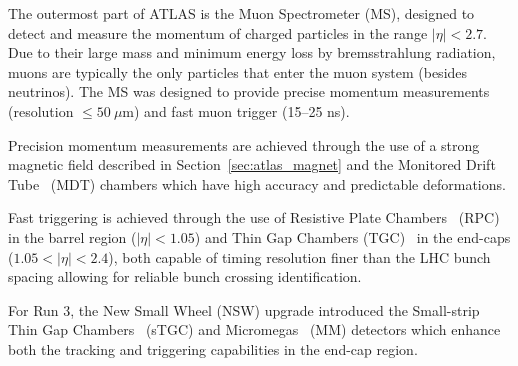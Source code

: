 The outermost part of ATLAS is the Muon Spectrometer (MS), designed to detect and measure the momentum of charged particles in the range $|\eta| < 2.7$. Due to their large mass and minimum energy loss by bremsstrahlung radiation, muons are typically the only particles that enter the muon system (besides neutrinos)\@. The MS was designed to provide precise momentum measurements (resolution $\leq 50 ~\mu$m) and fast muon trigger (15--25 ns). 

Precision momentum measurements are achieved through the use of a strong magnetic field described in Section~\ref{sec:atlas_magnet} and the Monitored Drift Tube~\cite{atlas_mdt_paper} (MDT) chambers which have high accuracy and predictable deformations.

Fast triggering is achieved through the use of Resistive Plate Chambers~\cite{atlas_run3_rpc_paper} (RPC) in the barrel region ($|\eta| < 1.05$) and Thin Gap Chambers (TGC)~\cite{atlas_tgc_paper} in the end-caps ($1.05 < |\eta| < 2.4$), both capable of timing resolution finer than the LHC bunch spacing allowing for reliable bunch crossing identification. 

For Run 3, the New Small Wheel (NSW) upgrade introduced the Small-strip Thin Gap Chambers~\cite{atlas_stgc_paper} (sTGC) and Micromegas~\cite{atlas_mm_paper} (MM) detectors which enhance both the tracking and triggering capabilities in the end-cap region.

